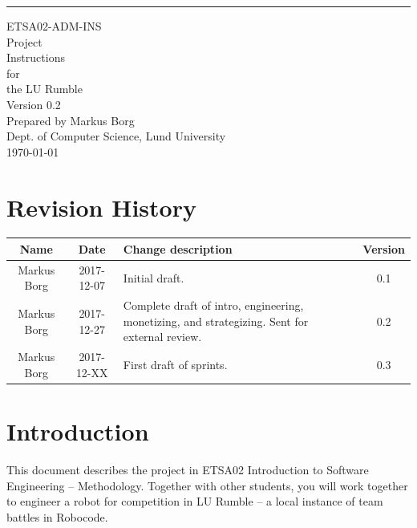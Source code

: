 \documentclass{scrreprt}
\date{}
\def\myversion{0.2 }
\begin{document}
\begin{flushright}
    \rule{16cm}{5pt}\vskip1cm
    \begin{bfseries}
    	\LARGE{ETSA02-ADM-INS}\\
    	\vspace{1.5cm}
        \Huge{Project\\ Instructions}\\
        \vspace{0.5cm}
        for\\
        \vspace{0.5cm}
        the LU Rumble\\
        \vspace{1.5cm}
        \LARGE{Version \myversion}\\ %
        \vspace{1.5cm}
        Prepared by Markus Borg\\
        Dept. of Computer Science, Lund University\\
        \vspace{1.5cm}
        \today\\
    \end{bfseries}
\end{flushright}

\tableofcontents


\chapter*{Revision History}

\begin{center}
    \begin{tabular}{|c|c|p{8cm}|c|}
        \hline
	    Name & Date & Change description & Version\\
        \hline
	    Markus Borg & 2017-12-07 & Initial draft. & 0.1\\
        \hline
        Markus Borg & 2017-12-27 & Complete draft of intro, engineering, monetizing, and strategizing. Sent for external review. & 0.2\\
        \hline
        Markus Borg & 2017-12-XX & First draft of sprints. & 0.3\\
        \hline
    \end{tabular}
\end{center}

\chapter{Introduction}
This document describes the project in ETSA02 Introduction to Software Engineering -- Methodology. Together with other students, you will work together to engineer a robot for competition in LU Rumble -- a local instance of team battles in Robocode. 
\end{document}
